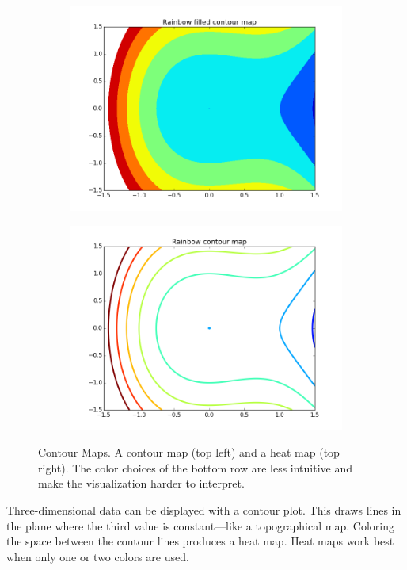 \begin{figure}[H]
\begin{subfigure}{.45\textwidth}
\includegraphics[width=\textwidth]{contour_map_rainbow_filled.png}
\end{subfigure}
\begin{subfigure}{.45\textwidth}
\centering
\includegraphics[width=\textwidth]{contour_map_rainbow.png}
\end{subfigure}
\caption{Contour Maps.  A contour map (top left) and a heat map (top right). 
The color choices of the bottom row are less intuitive and make the visualization harder to interpret.}
\label{fig:contour}
\end{figure}


Three-dimensional data can be displayed with a contour plot. 
This draws lines in the plane where the third value is constant---like a topographical map.  
Coloring the space between the contour lines produces a heat map.
Heat maps work best when only one or two colors are used.

